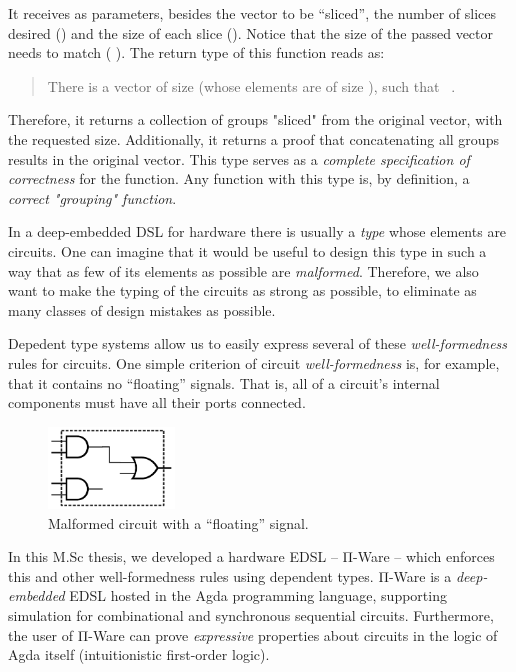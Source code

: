     It receives as parameters, besides the vector to be ``sliced'',
    the number of slices desired () and the size of each slice ().
    Notice that the size of the passed vector needs to match ( \AF{*} ).
    The return type of this function reads as:
    \begin{quote}
        There is a vector  of size 
        (whose elements are of size ), such that \texttt{   }.
    \end{quote}

    Therefore, it returns a collection of groups "sliced" from the original vector, with the requested size.
    Additionally, it returns a proof that concatenating all groups results in the original vector.
    This type serves as a \emph{complete specification of correctness} for the function.
    Any function with this type is, by definition, a \emph{correct "grouping" function}.

    In a deep-embedded \acs{DSL} for hardware there is usually a \emph{type} whose elements are circuits.
    One can imagine that it would be useful to design this type
    in such a way that as few of its elements as possible are \emph{malformed}.
    Therefore, we also want to make the typing of the circuits as strong as possible,
    to eliminate as many classes of design mistakes as possible.

    Depedent type systems allow us to easily express several of these \emph{well-formedness} rules for circuits.
    One simple criterion of circuit \emph{well-formedness} is, for example, that it contains no ``floating'' signals.
    That is, all of a circuit's internal components must have all their ports connected.

    \begin{figure}[h]
        \centerline{\includegraphics[width=0.3\textwidth]{imgs/floating-wire.pdf}}
        \caption{Malformed circuit with a ``floating'' signal. \label{fig:floating-wire}}
    \end{figure}

    In this M.Sc thesis, we developed a hardware \ac{EDSL} -- Π-Ware -- which enforces this and other
    well-formedness rules using dependent types.
    Π-Ware is a \emph{deep-embedded} \ac{EDSL} hosted in the Agda programming language,
    supporting simulation for combinational and synchronous sequential circuits.
    Furthermore, the user of Π-Ware can prove \emph{expressive} properties about circuits in the logic
    of Agda itself (intuitionistic first-order logic).

